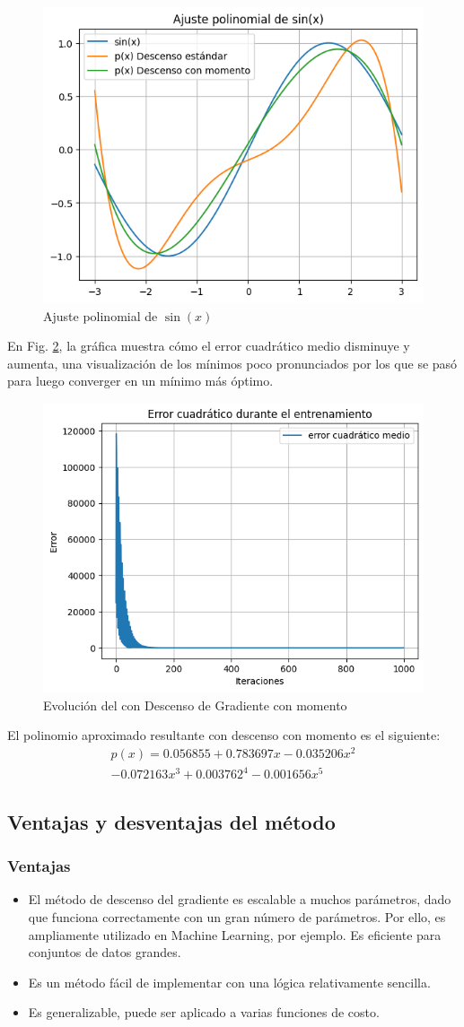 \documentclass[conference]{IEEEtran}
\begin{document}
\begin{figure}[htbp]
\centerline{\includegraphics[width=0.45 \textwidth]{fig5.png}}
\caption{Ajuste polinomial de $\sin(x)$}
\label{momentum-plot}
\end{figure}

En Fig. \ref{momentum-error}, la gráfica muestra cómo el error cuadrático medio disminuye y aumenta, una visualización de los mínimos poco pronunciados por los que se pasó para luego converger en un mínimo más óptimo.

\begin{figure}[htbp]
\centerline{\includegraphics[width=0.45 \textwidth]{fig6.png}}
\caption{Evolución del con Descenso de Gradiente con momento}
\label{momentum-error}
\end{figure}

El polinomio aproximado resultante con descenso con momento es el siguiente:
\begin{multline*}
    p(x)=0.056855+0.783697x-0.035206x^{2} \\
    -0.072163x^{3}+0.003762^{4}-0.001656x^{5}
\end{multline*}

\subsection{Ventajas y desventajas del método}\label{sec1:6}
\subsubsection{Ventajas}
\begin{itemize}
    \item El método de descenso del gradiente es escalable a muchos parámetros, dado que funciona correctamente con un gran número de parámetros. Por ello, es ampliamente utilizado en Machine Learning, por ejemplo. Es eficiente para conjuntos de datos grandes.
    \item Es un método fácil de implementar con una lógica relativamente sencilla.
    \item Es generalizable, puede ser aplicado a varias funciones de costo.
\end{itemize}
\end{document}
